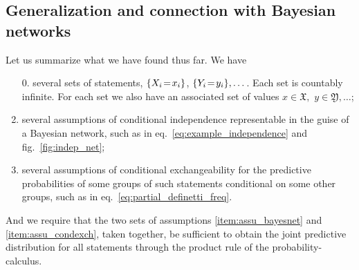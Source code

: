 \documentclass[\ifafour a4paper,12pt,\else a5paper,10pt,\fi%
onecolumn,oneside,article,%
british%
]{memoir}
\theoremstyle{remark}
\theoremstyle{innote}
\DeclarePairedDelimiter\set{\{}{\}}
\renewcommand*{\|}[1][]{\nonscript\,#1\vert\nonscript\,\mathopen{}}
\newcommand*{\eqn}{eq.}%
\newcommand*{\fig}{fig.}%
\renewcommand*{\=}{\TextOrMath\texteq\eq}
\newcommand*{\X}[1]{X_{#1}}
\newcommand*{\x}[1]{x_{#1}}
\newcommand*{\Y}[1]{Y_{#1}}
\newcommand*{\y}[1]{y_{#1}}
\newcommand*{\sx}{\mathfrak{X}}
\newcommand*{\sy}{\mathfrak{Y}}
\begin{document}
\subsection{Generalization and connection with Bayesian networks}
\label{sec:graph_repr_gen}

Let us summarize what we have found thus far. We have
\begin{enumerate}[label=\roman*.]
\item[0.] several sets of statements, $\set{\X{i}\=\x{i}}$,
  $\set{\Y{i}\=\y{i}},\dotsc$. Each set is countably infinite. For each
  set we also have an associated set of values $x\in \sx,$
  $y \in \sy, \dotsc$;
\item\label{item:assu_bayesnet} several assumptions of conditional independence representable in the
  guise of a Bayesian network, such as in
  \eqn~\eqref{eq:example_independence} and \fig~\ref{fig:indep_net};
\item\label{item:assu_condexch} several assumptions of conditional exchangeability for the predictive
  probabilities of some groups of such statements conditional on some other
  groups, such as in \eqn~\eqref{eq:partial_definetti_freq}.
\end{enumerate}
And we require that the two sets of assumptions \ref{item:assu_bayesnet}
and \ref{item:assu_condexch}, taken together, be sufficient to obtain the
joint predictive distribution for all statements through the product rule
of the probability-calculus.
\end{document}
